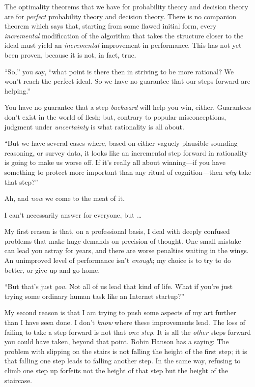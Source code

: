{
 The optimality theorems that we have for probability theory and
decision theory are for \textit{perfect} probability theory and
decision theory. There is no companion theorem which says that,
starting from some flawed initial form, every \textit{incremental}
modification of the algorithm that takes the structure closer to the
ideal must yield an \textit{incremental} improvement in performance.
This has not yet been proven, because it is not, in fact, true.}

{
 ``So,'' you say,
``what point is there then in striving to be more
rational? We won't reach the perfect ideal. So we have
no guarantee that our steps forward are helping.''}

{
 You have no guarantee that a step \textit{backward} will help you
win, either. Guarantees don't exist in the world of
flesh; but, contrary to popular misconceptions, judgment under
\textit{uncertainty} is what rationality is all about.}

{
 ``But we have several cases where, based on
either vaguely plausible-sounding reasoning, or survey data, it looks
like an incremental step forward in rationality is going to make us
worse off. If it's really all about winning---if you
have something to protect more important than any ritual of
cognition---then \textit{why} take that step?''}

{
 Ah, and \textit{now} we come to the meat of it.}

{
 I can't necessarily answer for everyone, but
\ldots}

{
 My first reason is that, on a professional basis, I deal with
deeply confused problems that make huge demands on precision of
thought. One small mistake can lead you astray for years, and there are
worse penalties waiting in the wings. An unimproved level of
performance isn't \textit{enough}; my choice is to try
to do better, or give up and go home.}

{
 ``But that's just \textit{you}.
Not all of us lead that kind of life. What if you're
just trying some ordinary human task like an Internet
startup?''}

{
 My second reason is that I am trying to push some aspects of my
art further than I have seen done. I don't
\textit{know} where these improvements lead. The loss of failing to
take a step forward is not that \textit{one step}. It is all the
\textit{other} steps forward you could have taken, beyond that point.
Robin Hanson has a saying: The problem with slipping on the stairs is
not falling the height of the first step; it is that falling one step
leads to falling another step. In the same way, refusing to climb one
step up forfeits not the height of that step but the height of the
staircase.}

